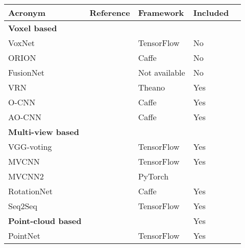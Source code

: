 \begin{table}[]
	\begin{tabular}{lllll}
		\hline
		\textbf{Acronym}            & \textbf{Reference}                       & \textbf{Framework} & \textbf{Included} &  \\ \hline
		\textbf{Voxel based }       &                                          &                    &                   &  \\
		VoxNet                      & \cite{maturana_voxnet:_2015}             & TensorFlow         & No                &  \\
		ORION                       & \cite{sedaghat_orientation-boosted_2016} & Caffe              & No                &  \\
		FusionNet                   & \cite{hegde_fusionnet:_2016}             & Not available      & No                &  \\
		VRN                         & \cite{brock_generative_2016}             & Theano             & Yes               &  \\
		O-CNN                       & \cite{wang_o-cnn:_2017}                  & Caffe              & Yes               &  \\
		AO-CNN                      & \cite{wang_adaptive_2018}                & Caffe              & Yes               &  \\
		\textbf{Multi-view based }  &                                          &                    &                   &  \\
		VGG-voting                  & \cite{simonyan_very_2014}                & TensorFlow         & Yes               &  \\
		MVCNN                       & \cite{su_multi-view_2015}                & TensorFlow         & Yes               &  \\
		MVCNN2                      & \cite{su_deeper_2018}                    & PyTorch            &                   &  \\
		RotationNet                 & \cite{kanezaki_rotationnet:_2016}        & Caffe              & Yes               &  \\
		Seq2Seq                     & \cite{zhizhong_seqviews2seqlabels:_2018} & TensorFlow         & Yes               &  \\
		\textbf{Point-cloud based } &                                          &                    & Yes               &  \\
		PointNet                    & \cite{qi_pointnet:_2016}                 & TensorFlow         & Yes               &  \\

\end{tabular}
\end{table}
